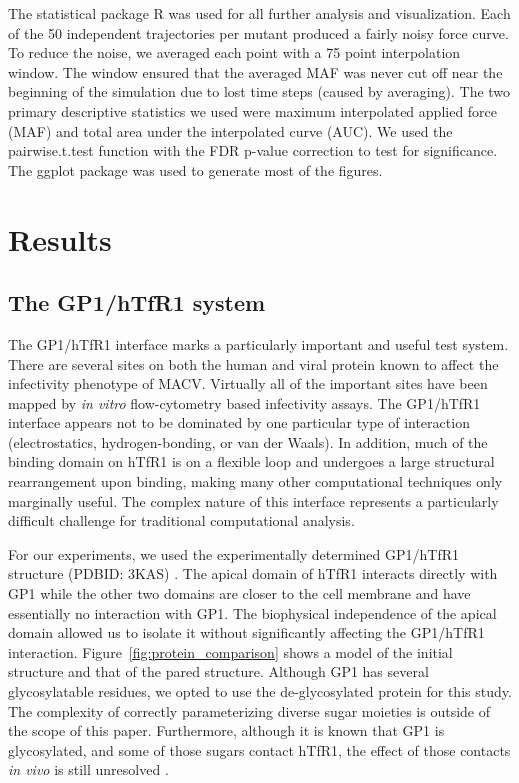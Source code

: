 \documentclass[12pt]{article}
\begin{document}
The statistical package R was used for all further analysis and visualization. Each of the 50 independent trajectories per mutant produced a fairly noisy force curve. To reduce the noise, we averaged each point with a 75 point interpolation window. The window ensured that the averaged MAF was never cut off near the beginning of the simulation due to lost time steps (caused by averaging). The two primary descriptive statistics we used were maximum interpolated applied force (MAF) and total area under the interpolated curve (AUC). We used the pairwise.t.test function with the FDR p-value correction to test for significance. The ggplot \citep{ggplot} package was used to generate most of the figures. 

\section*{Results}

\subsection*{The GP1/hTfR1 system}

The GP1/hTfR1 interface marks a particularly important and useful test system. There are several sites on both the human and viral protein known to affect the infectivity phenotype of MACV. Virtually all of the important sites have been mapped by \textit{in vitro} flow-cytometry based infectivity assays. The GP1/hTfR1 interface appears not to be dominated by one particular type of interaction (electrostatics, hydrogen-bonding, or van der Waals). In addition, much of the binding domain on hTfR1 is on a flexible loop and undergoes a large structural rearrangement upon binding, making many other computational techniques \citep{Grant2011,Kortemme2004} only marginally useful. The complex nature of this interface represents a particularly difficult challenge for traditional computational analysis. 

For our experiments, we used the experimentally determined GP1/hTfR1 structure (PDBID: 3KAS) \citep{Abraham2010}. The apical domain of hTfR1 interacts directly with GP1 while the other two domains are closer to the cell membrane and have essentially no interaction with GP1. The biophysical independence of the apical domain allowed us to isolate it without significantly affecting the GP1/hTfR1 interaction. Figure~\ref{fig:protein_comparison} shows a model of the initial structure and that of the pared structure. Although GP1 has several glycosylatable residues, we opted to use the de-glycosylated protein for this study. The complexity of correctly parameterizing diverse sugar moieties is outside of the scope of this paper. Furthermore, although it is known that GP1 is glycosylated, and some of those sugars contact hTfR1, the effect of those contacts \textit{in vivo} is still unresolved \citep{Abraham2010}.
\end{document}
